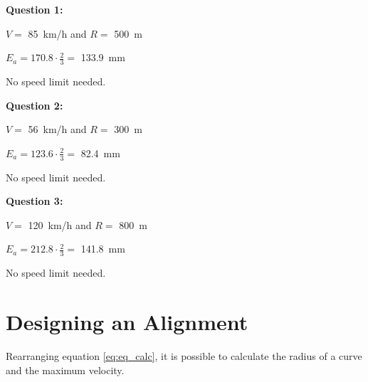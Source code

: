 \documentclass{bcrre_exam}
\begin{document}
\begin{questions}
\begin{solution}
    
    
    \textbf{Question 1:} 
    
    $V=$ \qty{85}{km/h} and $R=$ \qty{500}{m}

    $E_a=170.8 \cdot \frac{2}{3}=$ \qty{133.9}{mm}

    No speed limit needed.

    \textbf{Question 2:} 
    
    $V=$ \qty{56}{km/h} and $R=$ \qty{300}{m}

    $E_a=123.6 \cdot \frac{2}{3}=$ \qty{82.4}{mm}

    No speed limit needed.

    \textbf{Question 3:} 
    
    $V=$ \qty{120}{km/h} and $R=$ \qty{800}{m}

    $E_a=212.8 \cdot \frac{2}{3}=$ \qty{141.8}{mm}

    No speed limit needed.
    
\end{solution}

\end{questions}

\newpage
\section{Designing an Alignment}

Rearranging equation \ref{eq:eq_calc}, it is possible to calculate the radius of a curve and the maximum velocity.
\end{document}
